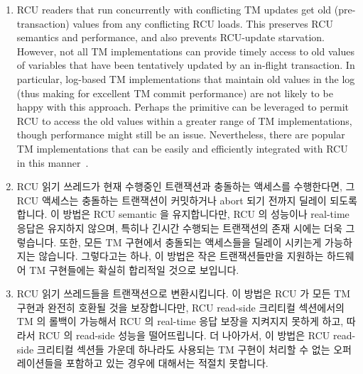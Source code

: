 \begin{enumerate}
\item	RCU readers that run concurrently with conflicting TM updates
	get old (pre-transaction) values from any conflicting RCU loads.
	This preserves RCU semantics and performance, and also prevents
	RCU-update starvation.
	However, not all TM implementations can provide timely access
	to old values of variables that have been tentatively updated
	by an in-flight transaction.
	In particular, log-based TM implementations that maintain
	old values in the log (thus making for excellent TM commit
	performance) are not likely to be happy with this approach.
	Perhaps the  primitive can be leveraged
	to permit RCU to access the old values within a greater range
	of TM implementations, though performance might still be an issue.
	Nevertheless, there are popular TM implementations that can
	be easily and efficiently integrated with RCU in this
	manner~\cite{DonaldEPorter2007TRANSACT,PhilHoward2011RCUTMRBTree,
	PhilipWHoward2013RCUrbtree}.
\fi
\item	RCU 읽기 쓰레드가 현재 수행중인 트랜잭션과 충돌하는 액세스를
	수행한다면, 그 RCU 액세스는 충돌하는 트랜잭션이 커밋하거나 abort 되기
	전까지 딜레이 되도록 합니다.
	이 방법은 RCU semantic 을 유지합니다만, RCU 의 성능이나 real-time
	응답은 유지하지 않으며, 특히나 긴시간 수행되는 트랜잭션의 존재 시에는
	더욱 그렇습니다.
	또한, 모든 TM 구현에서 충돌되는 액세스들을 딜레이 시키는게 가능하지는
	않습니다.
	그렇다고는 하나, 이 방법은 작은 트랜잭션들만을 지원하는 하드웨어 TM
	구현들에는 확실히 합리적일 것으로 보입니다.

\item	RCU 읽기 쓰레드들을 트랜잭션으로 변환시킵니다.
	이 방법은 RCU 가 모든 TM 구현과 완전히 호환될 것을 보장합니다만, RCU
	read-side 크리티컬 섹션에서의 TM 의 롤백이 가능해서 RCU 의 real-time
	응답 보장을 지켜지지 못하게 하고, 따라서 RCU 의 read-side 성능을
	떨어뜨립니다.
	더 나아가서, 이 방법은 RCU read-side 크리티컬 섹션들 가운데 하나라도
	사용되는 TM 구현이 처리할 수 없는 오퍼레이션들을 포함하고 있는 경우에
	대해서는 적절치 못합니다.
\iffalse


\end{enumerate}
